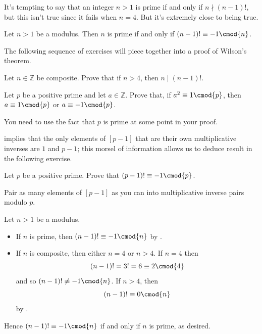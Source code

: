 It's tempting to say that an integer $n>1$ is prime if and only if $n \nmid (n-1)!$, but this isn't true since it fails when $n=4$. But it's extremely close to being true.

\begin{theorem} \label{thmWilson}
Let $n>1$ be a modulus. Then $n$ is prime if and only if $(n-1)! \equiv -1 \cmod{n}$.
\end{theorem}

The following sequence of exercises will piece together into a proof of Wilson's theorem.

\begin{exercise} \label{exCompositeDividesFactorial}
Let $n \in \mathbb{Z}$ be composite. Prove that if $n>4$, then $n \mid (n-1)!$.
\end{exercise}

\begin{exercise} \label{exSquareCongruentToOneModPrimeUnit}
Let $p$ be a positive prime and let $a \in \mathbb{Z}$. Prove that, if $a^2 \equiv 1 \cmod{p}$, then $a \equiv 1 \cmod{p}$ or $a \equiv {-1} \cmod{p}$. 
\begin{backhint}
You need to use the fact that $p$ is prime at some point in your proof.
\end{backhint}
\end{exercise}

 implies that the only elements of $[p-1]$ that are their own multiplicative inverses are $1$ and $p-1$; this morsel of information allows us to deduce result in the following exercise.

\begin{exercise}
\label{exPrimeFactorialCongruentToMinusOne}
Let $p$ be a positive prime. Prove that $(p-1)! \equiv -1 \cmod{p}$.
\begin{backhint}
Pair as many elements of $[p-1]$ as you can into multiplicative inverse pairs modulo $p$.
\end{backhint}
\end{exercise}

\begin{cproof}
Let $n>1$ be a modulus.
\begin{itemize} 
\item If $n$ is prime, then $(n-1)! \equiv -1 \cmod{n}$ by .
\item If $n$ is composite, then either $n=4$ or $n>4$. If $n=4$ then
\[ (n-1)! = 3! = 6 \equiv 2 \cmod{4} \]
and so $(n-1)! \not\equiv -1 \cmod{n}$. If $n>4$, then
\[ (n-1)! \equiv 0 \cmod{n} \]
by .
\end{itemize}
Hence $(n-1)! \equiv -1 \cmod{n}$ if and only if $n$ is prime, as desired.
\end{cproof}

